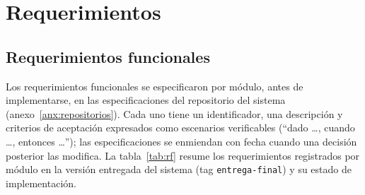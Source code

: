 \section{Requerimientos}\label{sec:requerimientos}

\subsection{Requerimientos funcionales}

Los requerimientos funcionales se especificaron por módulo, antes de
implementarse, en las especificaciones del repositorio del sistema
(anexo~\ref{anx:repositorios}). Cada uno tiene un identificador, una
descripción y criterios de aceptación expresados como escenarios
verificables (``dado \ldots, cuando \ldots, entonces \ldots''); las
especificaciones se enmiendan con fecha cuando una decisión posterior
las modifica. La tabla~\ref{tab:rf} resume los requerimientos registrados
por módulo en la versión entregada del sistema (tag
\texttt{entrega-final}) y su estado de implementación.

